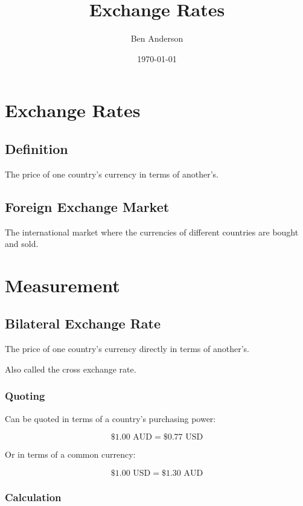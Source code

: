 \documentclass[a4paper,11pt]{article}
\begin{document}
\title{Exchange Rates}
\author{Ben Anderson}
\date{\today}
\maketitle
\pagebreak

\tableofcontents
\pagebreak


\section{Exchange Rates}

\subsection{Definition}

The price of one country's currency in terms of another's.

\subsection{Foreign Exchange Market}

The international market where the currencies of different countries are bought
and sold.




\section{Measurement}

\subsection{Bilateral Exchange Rate}

The price of one country's currency directly in terms of another's.

Also called the cross exchange rate.


\subsubsection{Quoting}

Can be quoted in terms of a country's purchasing power:

$$
\$1.00\text{ AUD} = \$0.77\text{ USD}
$$

Or in terms of a common currency:

$$
\$1.00\text{ USD} = \$1.30\text{ AUD}
$$


\subsubsection{Calculation}
\end{document}
